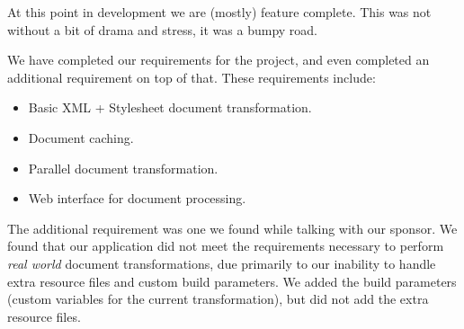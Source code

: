 At this point in development we are (mostly) feature complete.
This was not without a bit of drama and stress, it was a bumpy road.

We have completed our requirements for the project, and even completed an additional requirement on top of that.
These requirements include:

\begin{itemize}
  \item Basic XML + Stylesheet document transformation.
  \item Document caching.
  \item Parallel document transformation.
  \item Web interface for document processing.
\end{itemize}

The additional requirement was one we found while talking with our sponsor.
We found that our application did not meet the requirements necessary to perform \textit{real world} document transformations, due primarily to our inability to handle extra resource files and custom build parameters.
We added the build parameters (custom variables for the current transformation), but did not add the extra resource files.
